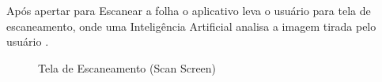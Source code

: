     Após apertar para Escanear a folha o aplicativo leva o usuário para tela de escaneamento, onde uma Inteligência Artificial analisa a imagem tirada pelo usuário .   

    \begin{figure}[H]
        \centering
        \caption{Tela de Escaneamento (Scan Screen)}%
        \label{phot:pg-4}
    \end{figure}

